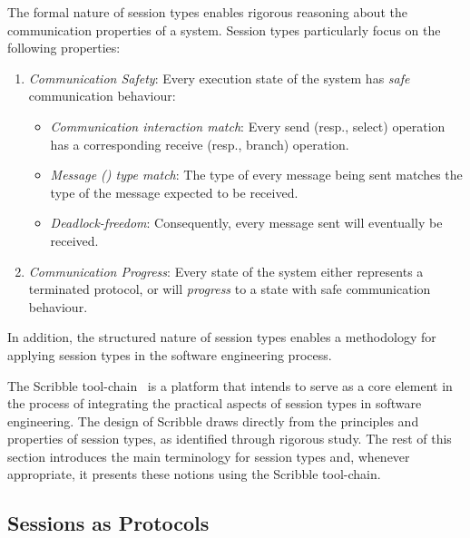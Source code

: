 The formal nature of session types enables rigorous
reasoning about the communication properties of a system.
Session types particularly focus on the following properties:
%
\begin{enumerate}[label=$\bullet$]
	\item	{\em Communication Safety}: Every execution state of the system has {\em safe} communication behaviour:
	\begin{itemize}
		\item	{\em Communication interaction match}:
				Every send (resp., select) operation has a corresponding receive (resp., branch) operation.
		\item	{\em Message () type match}:
				The type of every message being sent matches the type of the message expected to be received.
		\item	{\em Deadlock-freedom}:
				Consequently, every message sent will eventually be received.
	\end{itemize}
	
	\item	{\em Communication Progress}: Every state of the system either represents a terminated protocol, or
			will {\em progress} to a state with safe communication behaviour. 
\end{enumerate}
%
In addition, the structured nature of session types enables
a methodology for applying session types in the software 
engineering process.


The Scribble tool-chain~\cite{scribble} is a platform
that intends to serve as a core element in the process
of integrating the practical aspects of session types
in software engineering. The design of Scribble
draws directly from the principles and properties of session types,
as identified through rigorous study. The rest of this
section introduces the main terminology for session types
and, whenever appropriate, it presents these notions
using the Scribble tool-chain.

\subsection{Sessions as Protocols}%
\label{sec:sessions_scribble}


